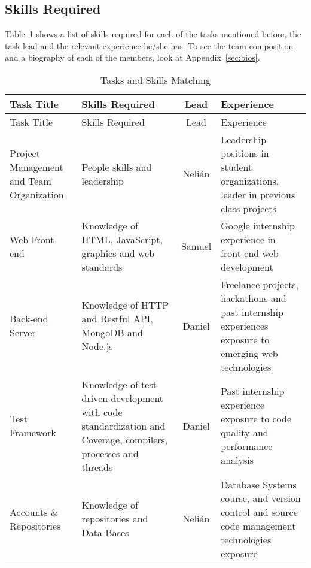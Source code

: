 
\subsection{Skills Required}

Table~\ref{skills} shows a list of skills required for each of the tasks
mentioned before, the task lead and the relevant experience he/she has. To see
the team composition and a biography of each of the members, look at
Appendix~\ref{sec:bios}.

\begin{center}
\setlength{\extrarowheight}{1.5pt}
  \begin{longtable}{|m{3cm}|m{5cm}|c|m{5cm}|}
 \caption{Tasks and Skills Matching \label{skills}} \\
   \hline
  
  \centering Task Title & Skills Required & Lead & Experience \\
  \hline \hline \endfirsthead
  
     \hline

	\centering Task Title & Skills Required & Lead & Experience \\  
	\hline \hline \endhead
  
  \endfoot  
  
  Project Management and Team Organization & People skills and leadership &
Nelián & Leadership positions in student organizations, leader in previous class
projects\\ \hline   Web Front-end & Knowledge of HTML, JavaScript, graphics and
web standards & Samuel & Google internship experience in front-end web
development\\ \hline   Back-end Server & Knowledge of HTTP and Restful API,
MongoDB and Node.js & Daniel & Freelance projects, hackathons and past
internship experiences exposure to emerging web technologies \\ \hline   Test
Framework & Knowledge of test driven development with code standardization and
Coverage, compilers, processes and threads & Daniel & Past internship experience
exposure to code quality and performance analysis\\ \hline   Accounts \&
Repositories & Knowledge of repositories and Data Bases & Nelián & Database
Systems course, and version control and source code management technologies
exposure\\ \hline    \end{longtable} \end{center}

